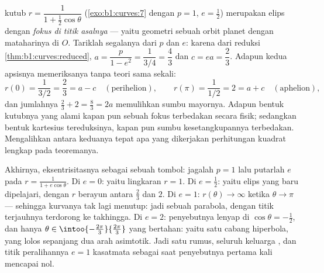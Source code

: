 \begin{example}
\label{ex:b1:curves:orbit}
 kutub $r = \dfrac{1}{1 + \frac12\cos\theta}$
(\cref{exo:b1:curves:7} dengan $p = 1$, $e = \frac12$) merupakan
elips dengan \emph{fokus di titik asalnya} --- yaitu geometri sebuah
orbit planet dengan mataharinya di $O$. Tariklah segalanya dari
$p$ dan $e$: karena dari reduksi
\cref{thm:b1:curves:reduced}, $a = \dfrac{p}{1 - e^2} =
\dfrac{1}{3/4} = \dfrac43$ dan $c = ea = \dfrac23$. Adapun kedua
apsisnya memeriksanya tanpa teori sama sekali:
\[
r(0) = \frac{1}{3/2} = \frac23 = a - c
\quad (\text{perihelion}),
\qquad
r(\pi) = \frac{1}{1/2} = 2 = a + c
\quad (\text{aphelion}),
\]
dan jumlahnya $\frac23 + 2 = \frac83 = 2a$ memulihkan sumbu
mayornya. Adapun bentuk kutubnya yang alami kapan pun sebuah fokus
terbedakan secara fisik; sedangkan bentuk kartesius tereduksinya, kapan pun
sumbu kesetangkupannya terbedakan. Mengalihkan antara keduanya tepat
apa yang dikerjakan perhitungan kuadrat lengkap pada teoremanya.

Akhirnya, eksentrisitasnya sebagai sebuah tombol: jagalah $p = 1$ lalu putarlah $e$ pada $r
= \frac{1}{1 + e\cos\theta}$. Di $e = 0$: yaitu lingkaran $r = 1$. Di
$e = \frac12$: yaitu elips yang baru dipelajari, dengan $r$ berayun antara
$\frac23$ dan $2$. Di $e = 1$: $r(\theta) \to \infty$ ketika $\theta
\to \pi$ --- sehingga kurvanya tak lagi menutup: jadi sebuah parabola, dengan
titik terjauhnya terdorong ke takhingga. Di $e = 2$: penyebutnya
lenyap di $\cos\theta = -\frac12$, dan hanya $\theta \in
\intoo{-\frac{2\pi}3}{\frac{2\pi}3}$ yang bertahan: yaitu satu cabang
hiperbola, yang lolos sepanjang dua arah asimtotik. Jadi satu
rumus, seluruh keluarga , dan titik peralihannya $e =
1$ kasatmata sebagai saat penyebutnya pertama kali mencapai nol.
\end{example}

